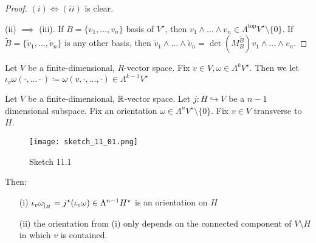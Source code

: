 \begin{proof}
    \((i)\iff(ii)\) is clear.

    (ii) \(\implies\) (iii). If \(B=\{v_1,\dots,v_n\}\) basis of \(V^\star\), then 
    \(v_1\wedge \dots\wedge v_n\in \Lambda^{\text{top}}V^\star\setminus\{0\}\). If \(\tilde{B}=\{\tilde{v}_1,\dots,\tilde{v}_n\}\)
    is any other basis, then \(\tilde{v}_1\wedge \dots\wedge \tilde{v}_n=\det(M_{B}^{\tilde{B}})v_1\wedge \dots\wedge v_n\).
\end{proof}

\begin{definition*}
    Let \(V\) be a finite-dimensional, \(R\)-vector space. Fix \(v\in V,\omega\in \Lambda^k V^\star\). Then we 
    let \(\iota_v\omega(\cdot,\dots\cdot)\coloneqq \omega(v,\cdot,\dots,\cdot)\in \Lambda^{k-1}V^\star\)
\end{definition*}

\begin{lemma}\label{lem:11.2}
    Let \(V\) be a finite-dimensional, \(\mathbb{R}\)-vector space. Let \(j:H\hookrightarrow V\) be a \(n-1\) dimensional 
    subspace. Fix an orientation \(\omega\in \Lambda^{n}V^\star\setminus\{0\}\). Fix \(v\in V\) transverse to \(H\).
    \begin{figure}[H]\label{fig:11.1}
        \centering
        \texttt{[image: sketch\_11\_01.png]}
        \caption{Sketch 11.1}
    \end{figure}  
    Then:
    \begin{enumerate}
        \item[(i)] \(\iota_v\omega_{|_{H}}=j^\star(\iota_v\omega)\in \Lambda^{n-1}H^\star\) is an orientation on \(H\)
        \item[(ii)] the orientation from (i) only depends on the connected component of \(V\setminus H\) in which \(v\) is contained. 
    \end{enumerate} 
\end{lemma}

